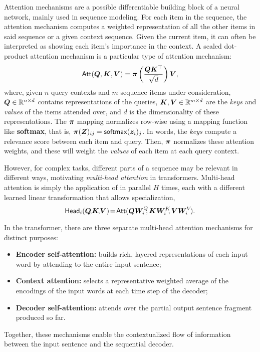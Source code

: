 \begin{definition}
    Attention mechanisms are a possible differentiable building block
    of a neural network, mainly used in sequence modeling. For each
    item in the sequence, the attention mechanism computes a weighted
    representation of all the other items in said sequence or a given
    context sequence. Given the current item, it can often be
    interpreted as showing each item's importance in the context. A
    scaled dot-product attention mechanism is a particular type of
    attention mechanism:
    \begin{equation}
        \operatorname{\mathsf{Att}}(\bm{Q}, \bm{K}, \bm{V}) = \bm{\pi}
        \left(\frac{\bm{Q}\bm{K}^\top}{\sqrt{d}}\right) \bm{V},
        \label{eq:att_scaled_dot}
    \end{equation}
    where, given $n$ query contexts and $m$ sequence items under
    consideration, $\bm{Q} \in \mathbb{R}^{n \times d}$ contains
    representations of the queries, $\bm{K}, \bm{V} \in \mathbb{R}^{m
            \times d}$ are the \emph{keys} and \emph{values} of the items
    attended over, and $d$ is the dimensionality of these
    representations. The $\bm{\pi}$ mapping normalizes row-wise using a mapping function like
    \textbf{softmax}, that is, $\bm{\pi}(\bm{Z})_{ij} = \operatorname*{\mathsf{softmax}}(\bm{z}_i)_j$.
    In words, the \emph{keys} compute a relevance score between each item
    and query. Then, $\bm{\pi}$ normalizes these attention weights, and
    these will weight the \emph{values} of each item at each query
    context.
\end{definition}

However, for complex tasks, different parts of a sequence may be
relevant in different ways, motivating \emph{multi-head attention} in
transformers. Multi-head attention is simply the application of
 in parallel $H$ times, each with a
different learned linear transformation that allows specialization,
%
\begin{equation}\label{eq:head}%
    \ath_i(\bm{Q}\!,\!\bm{K}\!,\!\bm{V})\!=\!\att(\bm{QW}_i^Q\!\!,\bm{KW}_i^K\!\!,\bm{VW}_i^V\!).
\end{equation}

In the transformer, there are three separate multi-head attention mechanisms for
distinct purposes:
%
\begin{itemize}
    \item \textbf{Encoder self-attention:} builds rich, layered representations of
          each input word by attending to the entire input sentence;
    \item \textbf{Context attention:} selects
          a representative weighted average of the encodings of the input words at each
          time step of the decoder;
    \item \textbf{Decoder self-attention:} attends over the partial output sentence
          fragment produced so far.
\end{itemize}
%
Together, these mechanisms enable the contextualized flow of information between
the input sentence and the sequential decoder.

